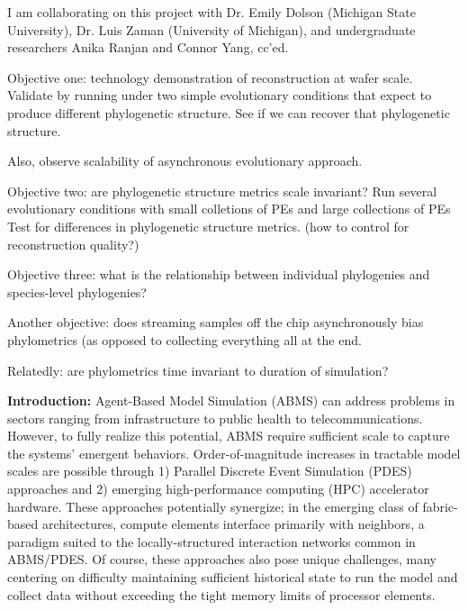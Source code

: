 I am collaborating on this project with Dr. Emily Dolson (Michigan State University), Dr. Luis Zaman (University of Michigan), and undergraduate researchers Anika Ranjan and Connor Yang, cc'ed.

Objective one: technology demonstration of reconstruction at wafer scale.
Validate by running under two simple evolutionary conditions that expect to produce different phylogenetic structure.
See if we can recover that phylogenetic structure.

Also, observe scalability of asynchronous evolutionary approach.

Objective two: are phylogenetic structure metrics scale invariant?
Run several evolutionary conditions with small colletions of PEs and large collections of PEs
Test for differences in phylogenetic structure metrics.
(how to control for reconstruction quality?)

Objective three: what is the relationship between individual phylogenies and species-level phylogenies?

Another objective: does streaming samples off the chip asynchronously bias phylometrics (as opposed to collecting everything all at the end.

Relatedly: are phylometrics time invariant to duration of simulation?


\noindent\textbf{Introduction:}
Agent-Based Model Simulation (ABMS) can address problems in sectors ranging from infrastructure to public health to
telecommunications.
However, to fully realize this potential, ABMS require sufficient scale to capture the systems' emergent behaviors.
Order-of-magnitude increases in tractable model scales are possible through 1) Parallel Discrete Event Simulation (PDES) approaches and 2) emerging high-performance computing (HPC) accelerator hardware.
These approaches potentially synergize; in the emerging class of fabric-based architectures, compute elements interface primarily with neighbors, a paradigm suited to the locally-structured interaction networks common in ABMS/PDES.
Of course, these approaches also pose unique challenges, many centering on difficulty maintaining sufficient historical state to run the model and collect data without exceeding the tight memory limits of processor elements.

